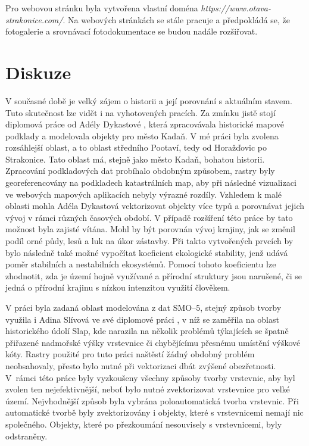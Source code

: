 \documentclass[thesis=M,czech]{FITthesis}[2012/06/26]
\begin{document}
Pro webovou stránku byla vytvořena vlastní doména \textit{https://www.otava-strakonice.com/}. Na webových stránkách se stále pracuje a předpokládá se, že fotogalerie a srovnávací fotodokumentace se budou nadále rozšiřovat.

\chapter{Diskuze}
V současné době je velký zájem o historii a její porovnání s aktuálním stavem. Tuto skutečnost lze vidět i na vyhotovených pracích. Za zmínku jistě stojí diplomová práce od Adély Dykastové  \cite{dykastova}, která zpracovávala historické mapové podklady a modelovala objekty pro město Kadaň. V mé práci byla zvolena rozsáhlejší oblast, a to oblast středního Pootaví, tedy od Horažďovic po Strakonice. Tato oblast má, stejně jako město Kadaň, bohatou historii. Zpracování podkladových dat probíhalo obdobným způsobem, rastry byly georeferencovány na podkladech katastrálních map, aby při následné vizualizaci ve webových mapových aplikacích nebyly výrazné rozdíly. Vzhledem k malé oblasti mohla Adéla Dykastová vektorizovat objekty více typů a porovnávat jejich vývoj v rámci různých časových období. V případě rozšíření této práce by tato možnost byla zajisté vítána. Mohl by být porovnán vývoj krajiny, jak se změnil podíl orné půdy, lesů a luk na úkor zástavby. Při takto vytvořených prvcích by bylo následně také možné vypočítat koeficient ekologické stability, jenž udává poměr stabilních a nestabilních ekosystémů. Pomocí tohoto koeficientu lze zhodnotit, zda je území hojně využívané a přírodní struktury jsou narušené, či se jedná o přírodní krajinu s nízkou intenzitou využití člověkem. 

V práci byla zadaná oblast modelována z dat SMO–5, stejný způsob tvorby využila i Adina Slívová ve své diplomové práci \cite{adina}, v níž se zaměřila na oblast historického údolí Slap, kde narazila na několik problémů týkajících se špatně přiřazené nadmořské výšky vrstevnice či chybějícímu přesnému umístění výškové kóty. Rastry použité pro tuto práci naštěstí žádný obdobný problém neobsahovaly, přesto bylo nutné při vektorizaci dbát zvýšené obezřetnosti. V~rámci této práce byly vyzkoušeny všechny způsoby tvorby vrstevnic, aby byl zvolen ten nejefektivnější, neboť bylo nutné zvektorizovat vrstevnice pro velké území. Nejvhodnější způsob byla vybrána poloautomatická tvorba vrstevnic. Při automatické tvorbě byly zvektorizovány i objekty, které s vrstevnicemi nemají nic společného. Objekty, které po přezkoumání nesouvisely s vrstevnicemi, byly odstraněny.
\end{document}
